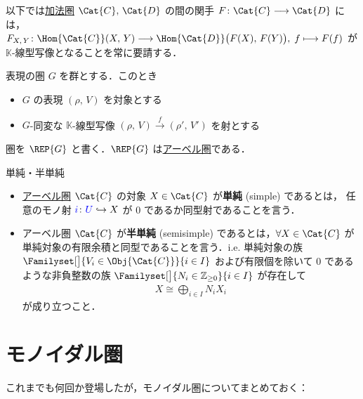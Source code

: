 \documentclass[TQFT_main]{subfiles}
\begin{document}
以下では\hyperref[def:additive-cat]{加法圏} $\Cat{C},\, \Cat{D}$ の間の関手 $F \colon \Cat{C} \lto \Cat{D}$ には，$F_{X,\, Y} \colon \Hom{\Cat{C}}(X,\, Y) \lto \Hom{\Cat{D}} \bigl( F(X),\, F(Y) \bigr),\; f \lmto F(f)$ が $\mathbb{K}$-線型写像となることを常に要請する．

\begin{myexample}[label=def:Rep]{表現の圏}
    $G$ を群とする．このとき
    \begin{itemize}
        \item $G$ の表現 $(\rho,\, V)$ を対象とする
        \item $G$-同変な $\mathbb{K}$-線型写像 $(\rho,\, V) \xrightarrow{f} (\rho',\, V')$ を射とする
    \end{itemize}
    圏を $\REP{G}$ と書く．$\REP{G}$ は\hyperref[def:additive-cat]{アーベル圏}である．
\end{myexample}

\begin{mydef}[label=def:semisimple-cat]{単純・半単純}
    \begin{itemize}
        \item \hyperref[def:additive-cat]{アーベル圏} $\Cat{C}$ の対象 $X \in \Cat{C}$ が\textbf{単純} (simple) であるとは，
        任意のモノ射 $\textcolor{blue}{i} \colon \textcolor{blue}{U} \hookrightarrow X$ が $0$ であるか同型射であることを言う．
        \item アーベル圏 $\Cat{C}$ が\textbf{半単純} (semisimple) であるとは，$\forall X \in \Cat{C}$ が単純対象の有限余積と同型であることを言う．i.e.
        単純対象の族 $\Familyset[\big]{V_i \in \Obj{\Cat{C}}}{i \in I}$ および有限個を除いて $0$ であるような非負整数の族 $\Familyset[\big]{N_i \in \mathbb{Z}_{\ge 0}}{i \in I}$ が存在して
        \begin{align}
            X \cong \bigoplus_{i \in I} N_i X_i
        \end{align}
        が成り立つこと．
    \end{itemize}
    
\end{mydef}

\section{モノイダル圏}

これまでも何回か登場したが，モノイダル圏についてまとめておく：
\end{document}
